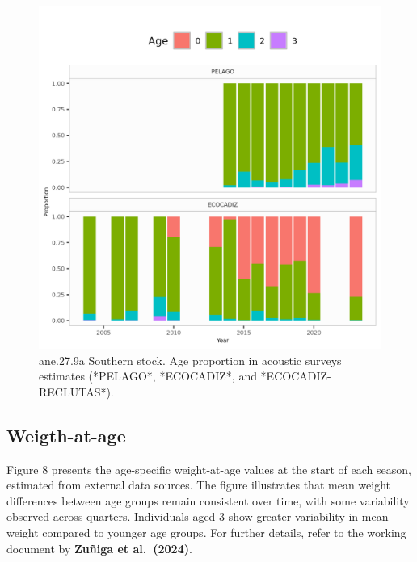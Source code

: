\documentclass[
]{article}
\begin{document}
\begin{figure}[H]

{\centering \includegraphics[width=0.95\linewidth]{report/run/S1.0_4FLEETS_SelECO_RecIndex_Mnewfix/fig_agecomp_by_quartersSurveys} 

}

\caption{ane.27.9a Southern stock. Age proportion in acoustic surveys estimates  (*PELAGO*, *ECOCADIZ*, and *ECOCADIZ-RECLUTAS*).}\label{fig:unnamed-chunk-8}
\end{figure}

\hypertarget{weigth-at-age}{%
\subsection{Weigth-at-age}\label{weigth-at-age}}

Figure 8 presents the age-specific weight-at-age values at the start of
each season, estimated from external data sources. The figure
illustrates that mean weight differences between age groups remain
consistent over time, with some variability observed across quarters.
Individuals aged 3 show greater variability in mean weight compared to
younger age groups. For further details, refer to the working document
by \textbf{Zuñiga et al.~(2024)}.
\end{document}

